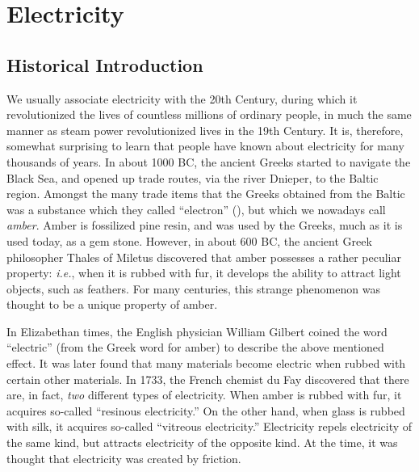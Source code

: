 \section{Electricity}\label{scharge}
\subsection{Historical Introduction}
We usually associate electricity with the 20th Century, during which it
revolutionized the lives of countless millions of ordinary people, in much the
same manner as steam power revolutionized lives in the 19th Century. 
It is, therefore, somewhat surprising to learn that  people have known about 
electricity for many
thousands of years. In about 1000 BC, the ancient Greeks started to navigate the
Black Sea, and opened up trade routes, via the river Dnieper, to the
Baltic region. Amongst the many trade items that the Greeks obtained from the Baltic
was a substance which they called ``electron'' (), but which we nowadays call {\em amber}. Amber is fossilized pine resin, and was used
by the Greeks, much  as it is used today, as a gem stone. However, in about 600 BC, the ancient Greek philosopher Thales of Miletus
discovered that amber possesses a rather peculiar property: {\em i.e.}, when it is rubbed with
 fur, it develops the ability to attract light objects, such as
feathers. For many centuries, this strange phenomenon was thought to be a  unique
property of amber.

In Elizabethan times,   the English physician William Gilbert  coined the word  ``electric''  (from the Greek
word for amber) to describe the above mentioned effect. It was later found  that many materials become electric when rubbed with certain other materials.
In 1733, the French chemist du Fay discovered that there are, in fact, {\em two}\/ different types of electricity.
When amber is rubbed with fur, it acquires so-called  ``resinous electricity.'' 
On the other hand, when glass is rubbed with silk, it
acquires so-called  ``vitreous electricity.'' Electricity
repels electricity of the same kind, but  attracts electricity of the opposite kind. At the time, it was thought that  electricity was created by friction.

